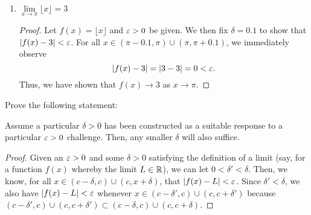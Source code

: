 \begin{problem}
\begin{enumerate}[label=(\alph*)]
\begin{proof}
\begin{itemize}
              The last inequality holds because $x^{2} + 2x + 4 \le 19$ for all
              $x$ such that $\abs{x - 2} < \delta \leq 1$,

            \item When $\eps > 19$, then $\delta = 1$. Then, for all $x$
              such that $\abs{x - 2} < 1$, it follows that
              \begin{align*}
                \abs{f(x) - 8} &= \\
                \abs{(x-2)(x^{2} +2x + 4)} &= \\
                \abs{x-2} \abs{x^{2} + 2x + 4} &< \abs{x^{2} + 2x + 4} \\ 
                                               &\leq 19 \\ 
                                               &< \eps
              \end{align*}
              because for all $x \in (1, 2) \cup (2, 3)$, the expression $x^{2} + 2x + 4$ is bounded above by $19$.

        \end{itemize}
        Thus, we have shown that $f(x) \to 8$ as $x \to 2$. 
      \end{proof}

    \item $\lim\limits_{x \to \pi} \lfloor x \rfloor = 3$ 
      \begin{proof}
        Let $f(x) = \lfloor x \rfloor$ and $\varepsilon > 0$ be given. We then fix $\delta = 0.1$ to show
        that $\left\lvert f(x) - 3 \right\rvert < \varepsilon$. For all $x \in (\pi - 0.1, \pi) \cup (\pi, \pi + 0.1)$, we immediately observe
        \[
          \left\lvert f(x) - 3 \right\rvert = \left\lvert 3 - 3 \right\rvert = 0 < \varepsilon.
        \]
        Thus, we have shown that $f(x) \to 3$ as $x \to \pi$.
      \end{proof}

  \end{enumerate}
\end{problem}


\begin{problem}
  \label{prob:smaller-delta-sufficient}
  Prove the following statement:
    \begin{displayquote}
      Assume a particular $\delta > 0$ has been constructed as a suitable response to
      a particular $\varepsilon > 0$ challenge. Then, any smaller $\delta$ will also suffice.
    \end{displayquote}

  \begin{proof}
    Given an $\varepsilon > 0$ and some $\delta > 0$ satisfying the definition of a
    limit (say, for a function $f(x)$ whereby the limit $L \in \mathbb{R}$), we can let
    $0 < \delta' < \delta$. Then, we know, for all $x \in (c - \delta, c) \cup (c, x + \delta)$, that
    $\left\lvert f(x) - L \right\rvert < \varepsilon$. Since $\delta' < \delta$, we also have $\left\lvert f(x) - L \right\rvert < \varepsilon$ whenever
    $x \in (c - \delta', c) \cup (c, c + \delta')$ because 
    $(c - \delta', c) \cup (c, c + \delta') \subset (c - \delta, c) \cup (c, c + \delta)$.
  \end{proof}
\end{problem}


